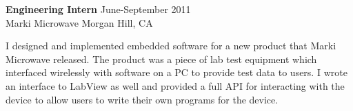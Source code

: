 \textbf{Engineering Intern} \hfill June-September 2011 \\
Marki Microwave \hfill Morgan Hill, CA
\begin{description}  \itemsep -2pt %
\item I designed and implemented embedded software for a new product that
Marki Microwave released. The product was a piece of lab test equipment
which interfaced wirelessly with software on a PC to provide test data
to users. I wrote an interface to LabView as well and provided a full
API for interacting with the device to allow users to write their own
programs for the device.
\end{description}
